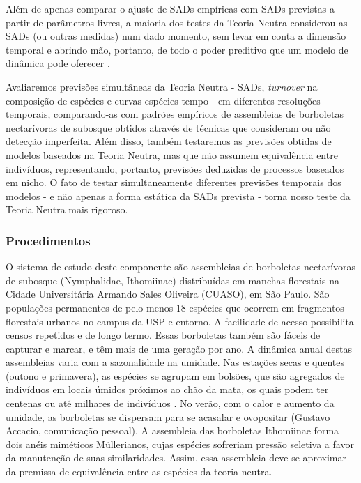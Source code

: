 \documentclass[12pt, A4]{article}
\begin{document}
Além de apenas comparar o ajuste de SADs empíricas com SADs previstas a
partir de parâmetros livres, a maioria dos testes da Teoria Neutra
considerou as SADs (ou outras medidas) num dado momento, sem
levar em conta a dimensão temporal e abrindo mão,
portanto, de todo o poder preditivo que um modelo de dinâmica pode oferecer \citep{leigh2007}. 

Avaliaremos previsões simultâneas da Teoria Neutra
- SADs, \emph{turnover} na composição de espécies e curvas espécies-tempo - em
diferentes resoluções temporais, comparando-as com padrões empíricos
de assembleias de borboletas nectarívoras de subosque obtidos através
de técnicas que consideram ou não detecção imperfeita. Além disso,
também testaremos as previsões obtidas de modelos baseados na Teoria
Neutra, mas que não assumem equivalência entre indivíduos,
representando, portanto, previsões deduzidas de processos baseados em
nicho. O fato de testar simultaneamente diferentes previsões temporais
dos modelos - e não apenas a forma estática da SADs prevista - torna
nosso teste da Teoria Neutra mais rigoroso. 

\subsubsection*{Procedimentos}
\label{sec:procedimentos}

O sistema de estudo deste componente são assembleias de borboletas
nectarívoras de subosque (Nymphalidae, Ithomiinae) distribuídas em
manchas florestais na Cidade Universitária Armando
Sales Oliveira (CUASO), em São Paulo. São populações permanentes de
pelo menos 18 espécies que ocorrem em fragmentos florestais urbanos no campus
da USP e entorno. A facilidade de acesso possibilita censos repetidos e de longo termo. Essas
borboletas também são fáceis de capturar e marcar, e têm mais de uma
geração por ano. A dinâmica anual destas assembleias varia com a
sazonalidade na umidade. Nas estações secas e quentes (outono e
primavera), as espécies se agrupam em bolsões, que são agregados de
indivíduos em locais úmidos próximos ao chão da mata, 
os quais podem ter centenas ou até milhares de indivíduos
\citep{canals2003}. 
No verão, com o calor e aumento da umidade, as
borboletas se dispersam para se acasalar e ovopositar (Gustavo
Accacio, comunicação pessoal). A assembleia das borboletas Ithomiinae
forma dois anéis miméticos Müllerianos, cujas espécies sofreriam
pressão seletiva a favor da manutenção de suas similaridades. Assim,
essa assembleia deve se aproximar da premissa 
de equivalência entre as espécies da teoria neutra. 
\end{document}
